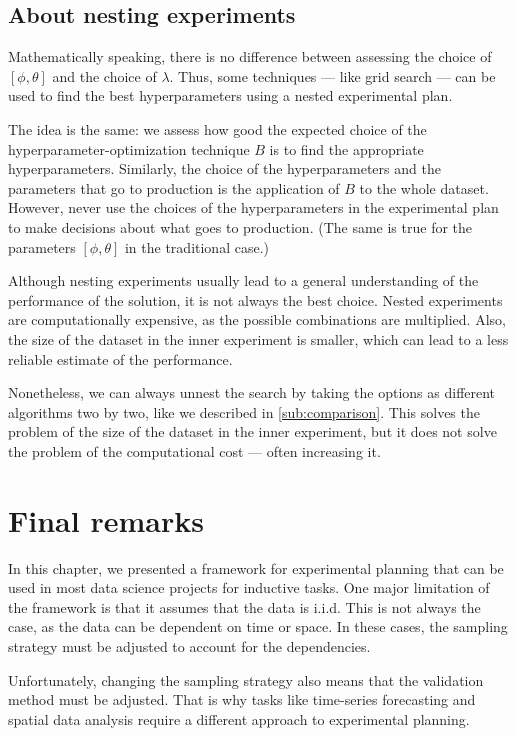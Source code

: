 \subsection{About nesting experiments}

Mathematically speaking, there is no difference between assessing the choice of
$\left[\phi, \theta\right]$ and the choice of $\lambda$.  Thus, some techniques --- like
grid search --- can be used to find the best hyperparameters using a nested experimental
plan.

The idea is the same: we assess how good the expected choice of the
hyperparameter-optimization technique $B$ is to find the appropriate hyperparameters.  Similarly,
the choice of the hyperparameters and the parameters that go to production is the
application of $B$ to the whole dataset.  However, never use the choices of the
hyperparameters in the experimental plan to make decisions about what goes to production.
(The same is true for the parameters $\left[\phi, \theta\right]$ in the traditional case.)

Although nesting experiments usually lead to a general understanding of the performance of
the solution, it is not always the best choice.  Nested experiments are computationally
expensive, as the possible combinations are multiplied.  Also, the size of the dataset
in the inner experiment is smaller, which can lead to a less reliable estimate of the
performance.

Nonetheless, we can always unnest the search by taking the options as different
algorithms two by two, like we described in \cref{sub:comparison}.  This solves the
problem of the size of the dataset in the inner experiment, but it does not solve the
problem of the computational cost --- often increasing it.

\section{Final remarks}

In this chapter, we presented a framework for experimental planning that can be used in
most data science projects for inductive tasks.  One major limitation of the framework is
that it assumes that the data is i.i.d.  This is not always the case, as the data can be
dependent on time or space.  In these cases, the sampling strategy must be adjusted to
account for the dependencies.

Unfortunately, changing the sampling strategy also means that the validation method must
be adjusted.  That is why tasks like time-series forecasting and spatial data analysis
require a different approach to experimental planning.

